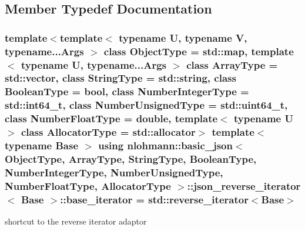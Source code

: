 \subsection{Member Typedef Documentation}
\hypertarget{classnlohmann_1_1basic__json_1_1json__reverse__iterator_a9ebc4c99e6fc90c965af0f39ad2ca70e}{
\subsubsection[{base\-\_\-iterator}]{\setlength{\rightskip}{0pt plus 5cm}template$<$template$<$ typename U, typename V, typename...\-Args $>$ class Object\-Type = std\-::map, template$<$ typename U, typename...\-Args $>$ class Array\-Type = std\-::vector, class String\-Type  = std\-::string, class Boolean\-Type  = bool, class Number\-Integer\-Type  = std\-::int64\-\_\-t, class Number\-Unsigned\-Type  = std\-::uint64\-\_\-t, class Number\-Float\-Type  = double, template$<$ typename U $>$ class Allocator\-Type = std\-::allocator$>$ template$<$typename Base $>$ using {\bf nlohmann\-::basic\-\_\-json}$<$ Object\-Type, Array\-Type, String\-Type, Boolean\-Type, Number\-Integer\-Type, Number\-Unsigned\-Type, Number\-Float\-Type, Allocator\-Type $>$\-::{\bf json\-\_\-reverse\-\_\-iterator}$<$ Base $>$\-::{\bf base\-\_\-iterator} =  std\-::reverse\-\_\-iterator$<$Base$>$}}\label{classnlohmann_1_1basic__json_1_1json__reverse__iterator_a9ebc4c99e6fc90c965af0f39ad2ca70e}


shortcut to the reverse iterator adaptor 

